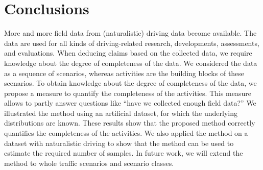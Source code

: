 \section{Conclusions}
\label{sec:conclusion}

More and more field data from (naturalistic) driving data become available. The data are used for all kinds of driving-related research, developments, assessments, and evaluations. When deducing claims based on the collected data, we require knowledge about the degree of completeness of the data. 
We considered the data as a sequence of scenarios, whereas activities are the building blocks of these scenarios. To obtain knowledge about the degree of completeness of the data, we propose a measure to quantify the completeness of the activities. This measure allows to partly answer questions like ``have we collected enough field data?'' 
We illustrated the method using an artificial dataset, for which the underlying distributions are known. These results show that the proposed method correctly quantifies the completeness of the activities. We also applied the method on a dataset with naturalistic driving to show that the method can be used to estimate the required number of samples.
In future work, we will extend the method to whole traffic scenarios and scenario classes.

